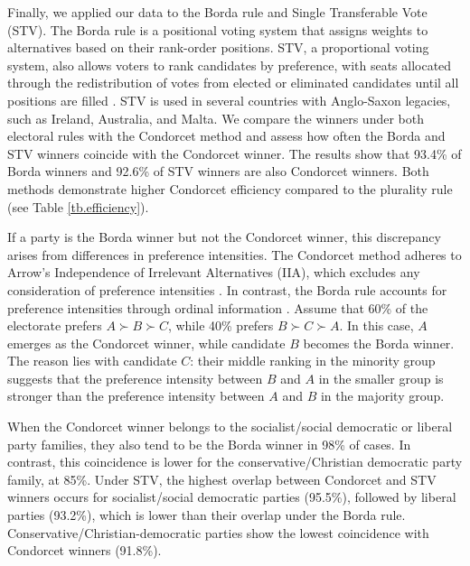 \documentclass[12pt]{scrartcl}
\begin{document}
Finally, we applied our data to the Borda rule and Single Transferable Vote (STV). The Borda rule is a positional voting system that assigns weights to alternatives based on their rank-order positions. STV, a proportional voting system, also allows voters to rank candidates by preference, with seats allocated through the redistribution of votes from elected or eliminated candidates until all positions are filled \citep{Tideman1995}. STV is used in several countries with Anglo-Saxon legacies, such as Ireland, Australia, and Malta. We compare the winners under both electoral rules with the Condorcet method and assess how often the Borda and STV winners coincide with the Condorcet winner. The results show that 93.4\% of Borda winners and 92.6\% of STV winners are also Condorcet winners. Both methods demonstrate higher Condorcet efficiency compared to the plurality rule (see Table \ref{tb.efficiency}). 

If a party is the Borda winner but not the Condorcet winner, this discrepancy arises from differences in preference intensities. The Condorcet method adheres to Arrow's Independence of Irrelevant Alternatives (IIA), which excludes any consideration of preference intensities \citep[Ch.~7]{Sen2017}. In contrast, the Borda rule accounts for preference intensities through ordinal information \citep{Maskin2024}. Assume that 60\% of the electorate prefers $A \succ B \succ C$, while 40\% prefers $B \succ C \succ A$. In this case, $A$ emerges as the Condorcet winner, while candidate $B$ becomes the Borda winner. The reason lies with candidate $C$: their middle ranking in the minority group suggests that the preference intensity between $B$ and $A$ in the smaller group is stronger than the preference intensity between $A$ and $B$ in the majority group.

When the Condorcet winner belongs to the socialist/social democratic or liberal party families, they also tend to be the Borda winner in 98\% of cases. In contrast, this coincidence is lower for the conservative/Christian democratic party family, at 85\%. Under STV, the highest overlap between Condorcet and STV winners occurs for socialist/social democratic parties (95.5\%), followed by liberal parties (93.2\%), which is lower than their overlap under the Borda rule. Conservative/Christian-democratic parties show the lowest coincidence with Condorcet winners (91.8\%).
\end{document}
